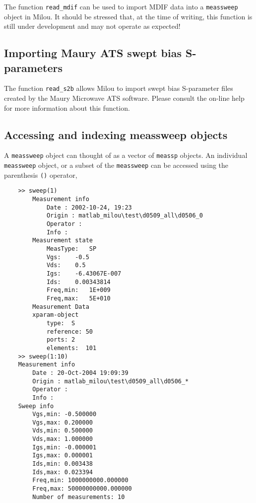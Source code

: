 The function \verb"read_mdif" can be used to import MDIF data into
a \verb"meassweep" object in Milou. It should be stressed that, at
the time of writing, this function is still under development and
may not operate as expected!

\subsection{Importing Maury ATS swept bias S-parameters}
The function \verb"read_s2b" allows Milou to import swept bias
S-parameter files created by the Maury Microwave ATS software.
Please consult the on-line help for more information about this
function.

\subsection{Accessing and indexing meassweep objects}
A \verb"meassweep" object can thought of as a vector of
\verb"meassp" objects. An individual \verb"meassweep" object, or a
subset of the \verb"meassweep" can be accessed using the
parenthesis \verb"()" operator,
\begin{small}
\begin{verbatim}
    >> sweep(1)
        Measurement info
            Date : 2002-10-24, 19:23
            Origin : matlab_milou\test\d0509_all\d0506_0
            Operator :
            Info :
        Measurement state
            MeasType:   SP
            Vgs:    -0.5
            Vds:    0.5
            Igs:    -6.43067E-007
            Ids:    0.00343814
            Freq,min:   1E+009
            Freq,max:   5E+010
        Measurement Data
        xparam-object
            type:  S
            reference: 50
            ports: 2
            elements:  101
    >> sweep(1:10)
    Measurement info
        Date : 20-Oct-2004 19:09:39
        Origin : matlab_milou\test\d0509_all\d0506_*
        Operator :
        Info :
    Sweep info
        Vgs,min: -0.500000
        Vgs,max: 0.200000
        Vds,min: 0.500000
        Vds,max: 1.000000
        Igs,min: -0.000001
        Igs,max: 0.000001
        Ids,min: 0.003438
        Ids,max: 0.023394
        Freq,min: 1000000000.000000
        Freq,max: 50000000000.000000
        Number of measurements: 10
\end{verbatim}
\end{small}

